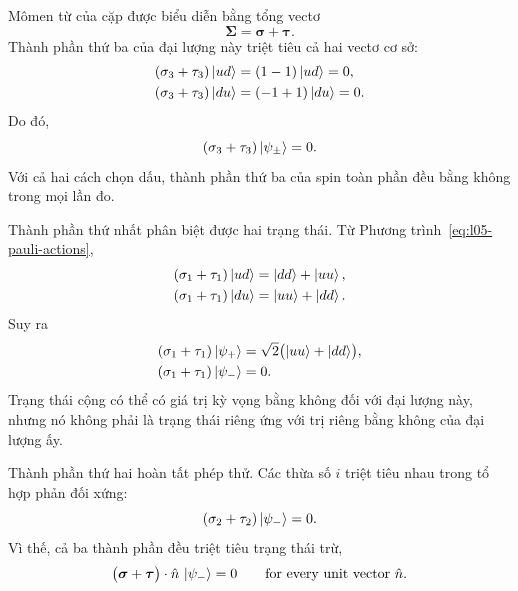 Mômen từ của cặp được biểu diễn bằng tổng vectơ
\begin{equation}
  \boldsymbol{\Sigma}
  =
  \boldsymbol{\sigma}+\boldsymbol{\tau}.
\end{equation}
Thành phần thứ ba của đại lượng này triệt tiêu cả hai vectơ cơ sở:
\begin{align}
  (\sigma_3+\tau_3)\left\lvert ud\right\rangle
  &=(1-1)\left\lvert ud\right\rangle=0,\nonumber\\
  (\sigma_3+\tau_3)\left\lvert du\right\rangle
  &=(-1+1)\left\lvert du\right\rangle=0.
\end{align}
Do đó,
\begin{equation}
  (\sigma_3+\tau_3)\left\lvert\psi_\pm\right\rangle=0.
\end{equation}
Với cả hai cách chọn dấu, thành phần thứ ba của spin toàn phần đều bằng không trong mọi lần đo.

Thành phần thứ nhất phân biệt được hai trạng thái. Từ Phương trình~\eqref{eq:l05-pauli-actions},
\begin{align}
  (\sigma_1+\tau_1)\left\lvert ud\right\rangle
  &=\left\lvert dd\right\rangle+\left\lvert uu\right\rangle,\nonumber\\
  (\sigma_1+\tau_1)\left\lvert du\right\rangle
  &=\left\lvert uu\right\rangle+\left\lvert dd\right\rangle.
\end{align}
Suy ra
\begin{align}
  (\sigma_1+\tau_1)\left\lvert\psi_+\right\rangle
  &=
  \sqrt2\bigl(\left\lvert uu\right\rangle+\left\lvert dd\right\rangle\bigr),\nonumber\\
  (\sigma_1+\tau_1)\left\lvert\psi_-\right\rangle
  &=0.
  \label{eq:l05-total-x}
\end{align}
Trạng thái cộng có thể có giá trị kỳ vọng bằng không đối với đại lượng này, nhưng nó không phải là trạng thái riêng ứng với trị riêng bằng không của đại lượng ấy.

\begin{classroomqa}
\end{classroomqa}

Thành phần thứ hai hoàn tất phép thử. Các thừa số \(i\) triệt tiêu nhau trong tổ hợp phản đối xứng:
\begin{equation}
  (\sigma_2+\tau_2)\left\lvert\psi_-\right\rangle=0.
\end{equation}
Vì thế, cả ba thành phần đều triệt tiêu trạng thái trừ,
\begin{equation}
  \bigl(\boldsymbol{\sigma}+\boldsymbol{\tau}\bigr)
  \cdot\hat n\,\left\lvert\psi_-\right\rangle=0
  \qquad\text{for every unit vector }\hat n.
  \label{eq:l05-singlet-any-axis}
\end{equation}

